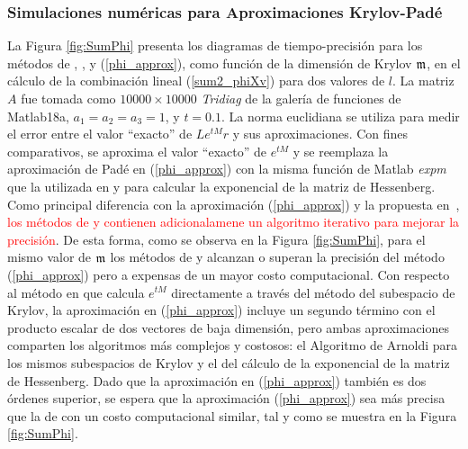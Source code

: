 \subsubsection{Simulaciones numéricas para Aproximaciones Krylov-Padé}
La Figura \ref{fig:SumPhi} presenta los diagramas de tiempo-precisión para los métodos de \cite{hochbruck1997krylov}, \cite{sidje1998expokit}, \cite{niesen2012algorithm} y (\ref{phi_approx}), como función de la dimensión de Krylov $\mathfrak{m}$, en el cálculo de la combinación lineal (\ref{sum2_phiXv}) para dos valores de $l$. La matriz $A$ fue tomada como $10000 \times 10000$ \textit{Tridiag} de la galería de funciones de Matlab18a, $a_1=a_2=a_3=1$, y $t=0.1$. La norma euclidiana se utiliza para medir el error entre el valor ``exacto'' de $L e^{t M}r$ y sus aproximaciones. Con fines comparativos, se aproxima el valor ``exacto'' de $e^{t M}$ y se reemplaza la aproximación de Padé en (\ref{phi_approx}) con la misma función de Matlab \textit{expm} que la utilizada en \cite{sidje1998expokit} y \cite{niesen2012algorithm} para calcular la exponencial de la matriz de Hessenberg. Como principal diferencia con la aproximación (\ref{phi_approx}) y la propuesta en~\cite{hochbruck1997krylov}, \textcolor{red}{los métodos de \cite{sidje1998expokit} y \cite{niesen2012algorithm} contienen adicionalamene un algoritmo iterativo para mejorar la precisión}. De esta forma, como se observa en la Figura \ref{fig:SumPhi}, para el mismo valor de $\mathfrak{m}$ los métodos de \cite{sidje1998expokit} y \cite{niesen2012algorithm} alcanzan o superan la precisión del método (\ref{phi_approx}) pero a expensas de un mayor costo computacional. Con respecto al método en \cite{hochbruck1997krylov} que calcula $e^{t M}$ directamente a través del método del subespacio de Krylov, la aproximación en (\ref{phi_approx}) incluye un segundo término con el producto escalar de dos vectores de baja dimensión, pero ambas aproximaciones comparten los  algoritmos más complejos y costosos: el Algoritmo de Arnoldi para los mismos subespacios de Krylov y el del cálculo de la exponencial de la  matriz de Hessenberg. Dado que la aproximación en (\ref{phi_approx}) también es dos órdenes superior, se espera que la aproximación (\ref{phi_approx}) sea más precisa que la de \cite{hochbruck1997krylov} con un costo computacional similar, tal y como se muestra en la Figura \ref{fig:SumPhi}.

